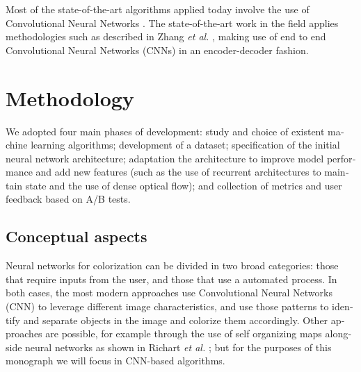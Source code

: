 \documentclass[12pt,openright,oneside,a4paper,english]{abntex2}
\begin{document}
\begin{otherlanguage}{english}
Most of the state-of-the-art algorithms applied today involve the use of Convolutional Neural Networks \cite{Larsson2016} \cite{Iizuka2016}. The state-of-the-art work in the field applies methodologies such as described in Zhang \textit{et al.} \cite{colorful}, making use of end to end Convolutional Neural Networks (CNNs) in an encoder-decoder fashion.






\chapter{Methodology}

We adopted four main phases of development: study and choice of existent machine learning algorithms; development of a dataset; specification of the initial neural network architecture; adaptation the architecture to improve model performance and add new features (such as the use of recurrent architectures to maintain state and the use of dense optical flow); and collection of metrics and user feedback based on A/B tests.

\section{Conceptual aspects} \label{sec:Concept}
Neural networks for colorization can be divided in two broad categories: those that require inputs from the user, and those that use a automated process. In both cases, the most modern approaches use Convolutional Neural Networks (CNN) to leverage different image characteristics, and use those patterns to identify and separate objects in the image and colorize them accordingly. Other approaches are possible, for example through the use of self organizing maps alongside neural networks as shown in Richart \textit{et al.} \cite{Richart_som_nn}; but for the purposes of this monograph we will focus in CNN-based algorithms.


\end{otherlanguage}
\end{document}
